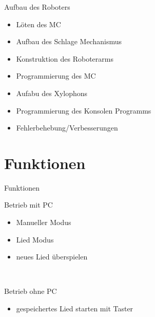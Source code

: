 \begin{frame}{Aufbau des Roboters}
\begin{itemize}
\item Löten des MC
\item Aufbau des Schlage Mechanismus
\item Konstruktion des Roboterarms
\item Programmierung des MC
\item Aufabu des Xylophons
\item Programmierung des Konsolen Programms
\item Fehlerbehebung/Verbesserungen
\end{itemize}
\end{frame}

\section{Funktionen}
\begin{frame}{Funktionen}
\begin{exampleblock}{Betrieb mit PC}
\begin{itemize}
\item Manueller Modus
\item Lied Modus
\item neues Lied überspielen
\end{itemize}
\end{exampleblock}
\\[0.5cm]
\begin{exampleblock}{Betrieb ohne PC}
\begin{itemize}
\item gespeichertes Lied starten mit Taster
\end{itemize}
\end{exampleblock}
\end{frame}

